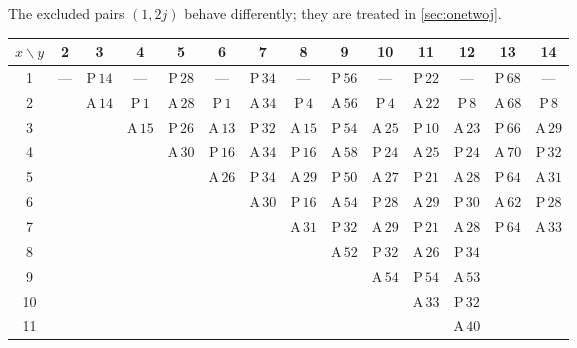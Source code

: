 \documentclass[11pt]{amsart}
\theoremstyle{definition}
\theoremstyle{remark}
\begin{document}
The excluded pairs $(1,2j)$ behave differently; they are treated in \cref{sec:onetwoj}.

\begin{table}[t]
\centering
\footnotesize
\setlength{\tabcolsep}{3.2pt}
\begin{tabular}{c|ccccccccccccc}
\toprule
$x\backslash y$ & 2 & 3 & 4 & 5 & 6 & 7 & 8 & 9 & 10 & 11 & 12 & 13 & 14\\
\midrule
1 & --- & $\mathrm{P}\,14$ & --- & $\mathrm{P}\,28$ & --- & $\mathrm{P}\,34$ & --- & $\mathrm{P}\,56$ & --- & $\mathrm{P}\,22$ & --- & $\mathrm{P}\,68$ & ---\\
2 &  & $\mathrm{A}\,14$ & $\mathrm{P}\,1$ & $\mathrm{A}\,28$ & $\mathrm{P}\,1$ & $\mathrm{A}\,34$ & $\mathrm{P}\,4$ & $\mathrm{A}\,56$ & $\mathrm{P}\,4$ & $\mathrm{A}\,22$ & $\mathrm{P}\,8$ & $\mathrm{A}\,68$ & $\mathrm{P}\,8$\\
3 &  &  & $\mathrm{A}\,15$ & $\mathrm{P}\,26$ & $\mathrm{A}\,13$ & $\mathrm{P}\,32$ & $\mathrm{A}\,15$ & $\mathrm{P}\,54$ & $\mathrm{A}\,25$ & $\mathrm{P}\,10$ & $\mathrm{A}\,23$ & $\mathrm{P}\,66$ & $\mathrm{A}\,29$\\
4 &  &  &  & $\mathrm{A}\,30$ & $\mathrm{P}\,16$ & $\mathrm{A}\,34$ & $\mathrm{P}\,16$ & $\mathrm{A}\,58$ & $\mathrm{P}\,24$ & $\mathrm{A}\,25$ & $\mathrm{P}\,24$ & $\mathrm{A}\,70$ & $\mathrm{P}\,32$\\
5 &  &  &  &  & $\mathrm{A}\,26$ & $\mathrm{P}\,34$ & $\mathrm{A}\,29$ & $\mathrm{P}\,50$ & $\mathrm{A}\,27$ & $\mathrm{P}\,21$ & $\mathrm{A}\,28$ & $\mathrm{P}\,64$ & $\mathrm{A}\,31$\\
6 &  &  &  &  &  & $\mathrm{A}\,30$ & $\mathrm{P}\,16$ & $\mathrm{A}\,54$ & $\mathrm{P}\,28$ & $\mathrm{A}\,29$ & $\mathrm{P}\,30$ & $\mathrm{A}\,62$ & $\mathrm{P}\,28$\\
7 &  &  &  &  &  &  & $\mathrm{A}\,31$ & $\mathrm{P}\,32$ & $\mathrm{A}\,29$ & $\mathrm{P}\,21$ & $\mathrm{A}\,28$ & $\mathrm{P}\,64$ & $\mathrm{A}\,33$\\
8 &  &  &  &  &  &  &  & $\mathrm{A}\,52$ & $\mathrm{P}\,32$ & $\mathrm{A}\,26$ & $\mathrm{P}\,34$ &  & \\
9 &  &  &  &  &  &  &  &  & $\mathrm{A}\,54$ & $\mathrm{P}\,54$ & $\mathrm{A}\,53$ &  & \\
10 &  &  &  &  &  &  &  &  &  & $\mathrm{A}\,33$ & $\mathrm{P}\,32$ &  & \\
11 &  &  &  &  &  &  &  &  &  &  & $\mathrm{A}\,40$ &  & \\
\bottomrule
\end{tabular}

\end{table}
\end{document}

